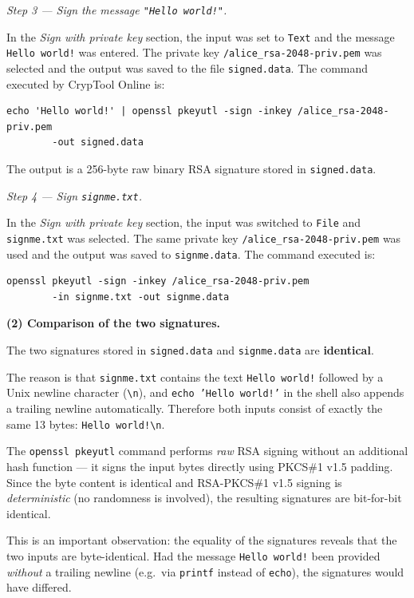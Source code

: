 \documentclass[]{scrartcl}
\begin{document}
{\medskip
\textit{Step 3 --- Sign the message \texttt{"Hello world!"}.}

In the \emph{Sign with private key} section, the input was set to
\texttt{Text} and the message \texttt{Hello world!} was entered.
The private key \texttt{/alice\_rsa-2048-priv.pem} was selected and the output
was saved to the file \texttt{signed.data}.
The command executed by CrypTool Online is:

\begin{lstlisting}[style=plusStyle]
echo 'Hello world!' | openssl pkeyutl -sign -inkey /alice_rsa-2048-priv.pem
        -out signed.data
\end{lstlisting}

The output is a 256-byte raw binary RSA signature stored in \texttt{signed.data}.

\medskip
\textit{Step 4 --- Sign \texttt{signme.txt}.}

In the \emph{Sign with private key} section, the input was switched to
\texttt{File} and \texttt{signme.txt} was selected.
The same private key \texttt{/alice\_rsa-2048-priv.pem} was used and the output
was saved to \texttt{signme.data}.
The command executed is:

\begin{lstlisting}[style=plusStyle]
openssl pkeyutl -sign -inkey /alice_rsa-2048-priv.pem
        -in signme.txt -out signme.data
\end{lstlisting}

\medskip
\textbf{(2) Comparison of the two signatures.}

The two signatures stored in \texttt{signed.data} and \texttt{signme.data} are
\textbf{identical}.

The reason is that \texttt{signme.txt} contains the text \texttt{Hello world!}
followed by a Unix newline character (\texttt{\textbackslash n}), and
\texttt{echo 'Hello world!'} in the shell also appends a trailing newline
automatically.
Therefore both inputs consist of exactly the same 13 bytes:
\texttt{Hello world!\textbackslash n}.

The \texttt{openssl pkeyutl} command performs \emph{raw} RSA signing without an
additional hash function --- it signs the input bytes directly using PKCS\#1 v1.5
padding.
Since the byte content is identical and RSA-PKCS\#1 v1.5 signing is
\emph{deterministic} (no randomness is involved), the resulting signatures are
bit-for-bit identical.

This is an important observation: the equality of the signatures reveals that the
two inputs are byte-identical.
Had the message \texttt{Hello world!} been provided \emph{without} a trailing
newline (e.g.\ via \texttt{printf} instead of \texttt{echo}), the signatures
would have differed.

}
\end{document}
